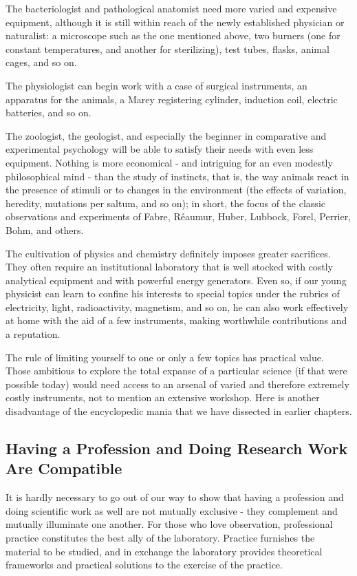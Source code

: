 \documentclass{article}
\begin{document}
The bacteriologist and pathological anatomist need more varied and expensive equipment, although it is still within reach of the newly established physician or naturalist: a microscope such as the one mentioned above, two burners (one for constant temperatures, and another for sterilizing), test tubes, flasks, animal cages, and so on.

The physiologist can begin work with a case of surgical instruments, an apparatus for the animals, a Marey registering cylinder, induction coil, electric batteries, and so on.

The zoologist, the geologist, and especially the beginner in comparative and experimental psychology will be able to satisfy their needs with even less equipment. Nothing is more economical - and intriguing for an even modestly philosophical mind - than the study of instincts, that is, the way animals react in the presence of stimuli or to changes in the environment (the effects of variation, heredity, mutations per saltum, and so on); in short, the focus of the classic observations and experiments of Fabre, Réaumur, Huber, Lubbock, Forel, Perrier, Bohm, and others.

The cultivation of physics and chemistry definitely imposes greater sacrifices. They often require an institutional laboratory that is well stocked with costly analytical equipment and with powerful energy generators. Even so, if our young physicist can learn to confine his interests to special topics under the rubrics of electricity, light, radioactivity, magnetism, and so on, he can also work effectively at home with the aid of a few instruments, making worthwhile contributions and a reputation.

The rule of limiting yourself to one or only a few topics has practical value. Those ambitious to explore the total expanse of a particular science (if that were possible today) would need access to an arsenal of varied and therefore extremely costly instruments, not to mention an extensive workshop. Here is another disadvantage of the encyclopedic mania that we have dissected in earlier chapters.

\subsection*{Having a Profession and Doing Research Work Are Compatible}

It is hardly necessary to go out of our way to show that having a profession and doing scientific work as well are not mutually exclusive - they complement and mutually illuminate one another. For those who love observation, professional practice constitutes the best ally of the laboratory. Practice furnishes the material to be studied, and in exchange the laboratory provides theoretical frameworks and practical solutions to the exercise of the practice.
\end{document}
